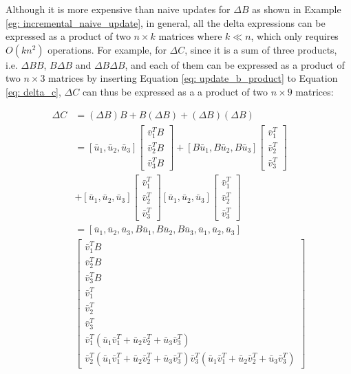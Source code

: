 Although it is more expensive than naive updates for $\Delta B$ as shown in Example \ref{eg: incremental_naive_update}, in general, all the delta expressions can be expressed as a product of two $n \times k$ matrices where $k \ll n$, which only requires $O(kn^2)$ operations. For example, for $\Delta C$, since it is a sum of three products, i.e. $\Delta B B$, $B \Delta B$ and $\Delta B \Delta B$, and each of them can be expressed as a product of two $n \times 3$ matrices by inserting Equation \ref{eq: update_b_product} to Equation \ref{eq: delta_c}, $\Delta C$ can thus be expressed as a a product of two $n \times 9$ matrices:


\begin{equation}
\begin{split}
    \Delta C &= (\Delta B) B + B (\Delta B) + (\Delta B) (\Delta B) \\&=[\bar{u}_1, \bar{u}_2, \bar{u}_3]
\begin{bmatrix}
    \bar{v}^T_1B \\
    \bar{v}^T_2B \\
    \bar{v}^T_3B 
\end{bmatrix}+[B\bar{u}_1, B\bar{u}_2, B\bar{u}_3]
\begin{bmatrix}
    \bar{v}^T_1 \\
    \bar{v}^T_2 \\
    \bar{v}^T_3 
\end{bmatrix}\\
&+[\bar{u}_1, \bar{u}_2, \bar{u}_3]
\begin{bmatrix}
    \bar{v}^T_1  \\
    \bar{v}^T_2  \\
    \bar{v}^T_3  
\end{bmatrix}
[\bar{u}_1, \bar{u}_2, \bar{u}_3]
\begin{bmatrix}
    \bar{v}^T_1  \\
    \bar{v}^T_2  \\
    \bar{v}^T_3  
\end{bmatrix}\\
&=[\bar{u}_1, \bar{u}_2, \bar{u}_3, B\bar{u}_1, B\bar{u}_2, B\bar{u}_3, \bar{u}_1, \bar{u}_2, \bar{u}_3]\\
&\begin{bmatrix}
    \bar{v}^T_1B \\
    \bar{v}^T_2B \\
    \bar{v}^T_3B \\
    \bar{v}^T_1  \\
    \bar{v}^T_2  \\
    \bar{v}^T_3  \\
    \bar{v}^T_1(\bar{u}_1\bar{v}^T_1 + \bar{u}_2\bar{v}^T_2 + \bar{u}_3\bar{v}^T_3)\\
    \bar{v}^T_2(\bar{u}_1\bar{v}^T_1 + \bar{u}_2\bar{v}^T_2 + \bar{u}_3\bar{v}^T_3)
    \bar{v}^T_3(\bar{u}_1\bar{v}^T_1 + \bar{u}_2\bar{v}^T_2 + \bar{u}_3\bar{v}^T_3)
\end{bmatrix}
\end{split}
\end{equation}

